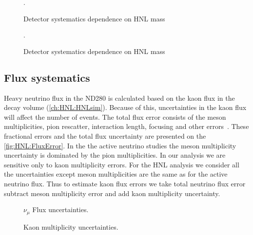 \documentclass[../main.tex]{subfiles}
\begin{document}
\begin{figure}[!ht]
  \begin{minipage}{0.49\linewidth}
  \end{minipage}
  \begin{minipage}{0.49\linewidth}
  \end{minipage}
  \caption{Detector systematics dependence on HNL mass}.
  \label{fig:HNL:sys}
\end{figure}

\begin{figure}[!ht]
  \caption{Detector systematics dependence on HNL mass}.
  \label{fig:HNL:sysDimuon}
\end{figure}


\subsection{Flux systematics}

Heavy neutrino flux in the ND280 is calculated based on the kaon flux in the decay volume (\autoref{ch:HNL:HNLsim}). Because of this, uncertainties in the kaon flux will affect the number of events. The total flux error consists of the meson multiplicities, pion rescatter, interaction length, focusing and other errors~\cite{Abe2013}. These fractional errors and the total flux uncertainty are presented on the \autoref{fig:HNL:FluxError}. In the the active neutrino studies the meson multiplicity uncertainty is dominated by the pion multiplicities. In our analysis we are sensitive only to kaon multiplicity errors. For the HNL analysis we consider all the uncertainties except meson multiplicities are the same as for the active neutrino flux. Thus to estimate kaon flux errors we take total neutrino flux error subtract meson multiplicity error and add kaon multiplicity uncertainty.

\begin{figure}[!ht]
\begin{minipage}{0.49\linewidth}
  \caption{$\nu_\mu$ Flux uncertainties.}
  \label{fig:HNL:FluxError}
\end{minipage}
\hfill
\begin{minipage}{0.49\linewidth}
  \caption{Kaon multiplicity uncertainties.}
  \label{fig:HNL:KaonMult}
\end{minipage}
\end{figure}
\end{document}
